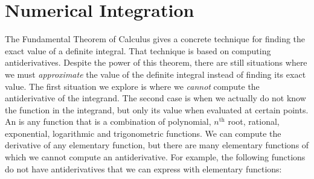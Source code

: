 \section{Numerical Integration}\label{sec:numerical_integration}

The Fundamental Theorem of Calculus gives a concrete technique for finding the exact value of a definite integral. That technique is based on computing antiderivatives. Despite the power of this theorem, there are still situations where we must \textit{approximate} the value of the definite integral instead of finding its exact value. The first situation we explore is where we \textit{cannot} compute the antiderivative of the integrand. The second case is when we actually do not know the function in the integrand, but only its value when evaluated at certain points.\\ %


%
An  is any function that is a combination of polynomial, $n^{\text{th}}$ root, rational, exponential, logarithmic and trigonometric functions. We can compute the derivative of any elementary function, but there are many elementary functions of which we cannot compute an antiderivative. For example, the following functions do not have antiderivatives that we can express with elementary functions:

